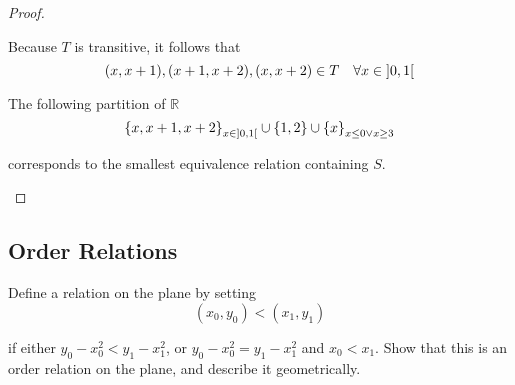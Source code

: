 \begin{proof}
\begin{enumerate}[label={(\alph*)}]
              Because $T$ is transitive, it follows that
              \[
                  (x, x+1), (x+1, x+2), (x, x+2)\in T\quad \forall x\in\left]{0, 1}\right[
              \]

              The following partition of $\mathbb{R}$
              \[
                  {\{ x, x + 1, x + 2 \}}_{x\in\left]{0, 1}\right[} \cup \{ 1, 2 \} \cup {\{ x \}}_{x\leq 0\lor x\geq 3}
              \]

              corresponds to the smallest equivalence relation containing $S$.
    \end{enumerate}
\end{proof}

\subsection*{Order Relations}

\begin{exercise}\label{chapter1:section3:exercise6}
    Define a relation on the plane by setting
    \[
        (x_{0}, y_{0}) < (x_{1}, y_{1})
    \]

    if either $y_{0} - x_{0}^{2} < y_{1} - x_{1}^{2}$, or $y_{0} - x_{0}^{2} = y_{1} - x_{1}^{2}$ and $x_{0} < x_{1}$. Show that this is an order relation on the plane, and describe it geometrically.
\end{exercise}

